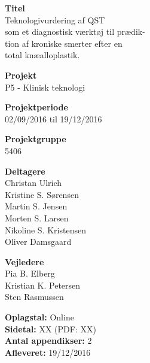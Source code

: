 \begin{minipage}[t]{0.48\textwidth}
\textbf{Titel} \\[5pt]\hspace*{2ex} 
Teknologivurdering af QST \\\hspace*{2ex} 
som et diagnostisk værktøj til prædik-\\\hspace*{2ex}
tion af kroniske  smerter efter en \\\hspace*{2ex}
total knæalloplastik.\\\hspace*{2ex}



\textbf{Projekt} \\[5pt]\hspace*{2ex} 
P5 - Klinisk teknologi\\\hspace*{2ex}


\textbf{Projektperiode} \\[5pt]\bigskip\hspace{2ex}
02/09/2016 til 19/12/2016

\textbf{Projektgruppe} \\[5pt]\bigskip\hspace{2ex}
5406

\textbf{Deltagere} \\[5pt]\hspace*{2ex}
Christan Ulrich \\\hspace*{2ex}
Kristine S. Sørensen \\\hspace*{2ex}
Martin S. Jensen \\\hspace*{2ex}
Morten S. Larsen\\\hspace*{2ex}
Nikoline S. Kristensen \\\hspace*{2ex}
Oliver Damsgaard \\\bigskip\hspace*{2ex}

\textbf{Vejledere} \\[5pt]\hspace*{2ex}
Pia B. Elberg \\\hspace*{2ex}
Kristian K. Petersen\\\hspace*{2ex}
Sten Rasmussen\\\smallskip\hspace*{2ex}

\textbf{Oplagstal:} Online \\
\textbf{Sidetal:} XX (PDF: XX) \\
\textbf{Antal appendikser:} 2 \\ 
\textbf{Afleveret:} 19/12/2016

\end{minipage}
